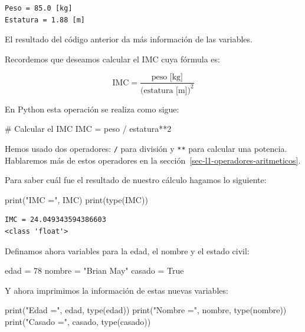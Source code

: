 \documentclass[
  spanish,
  letterpaper,
]{scrbook}
\newenvironment{Shaded}{\begin{snugshade}}{\end{snugshade}}
\newcommand{\BuiltInTok}[1]{\textcolor[rgb]{0.00,0.23,0.31}{#1}}
\newcommand{\CommentTok}[1]{\textcolor[rgb]{0.37,0.37,0.37}{#1}}
\newcommand{\DecValTok}[1]{\textcolor[rgb]{0.68,0.00,0.00}{#1}}
\newcommand{\NormalTok}[1]{\textcolor[rgb]{0.00,0.23,0.31}{#1}}
\newcommand{\OperatorTok}[1]{\textcolor[rgb]{0.37,0.37,0.37}{#1}}
\newcommand{\StringTok}[1]{\textcolor[rgb]{0.13,0.47,0.30}{#1}}
\newcommand{\VariableTok}[1]{\textcolor[rgb]{0.07,0.07,0.07}{#1}}
\theoremstyle{definition}
\theoremstyle{remark}
\begin{document}
\begin{verbatim}
Peso = 85.0 [kg]
Estatura = 1.88 [m]
\end{verbatim}

El resultado del código anterior da más información de las variables.

Recordemos que deseamos calcular el IMC cuya fórmula es:

\[
\text{IMC} = \dfrac{\text{peso [kg]}}{(\text{estatura [m])}^2}
\]

En Python esta operación se realiza como sigue:

\begin{Shaded}
\begin{Highlighting}[]
\CommentTok{\# Calcular el IMC}
\NormalTok{IMC }\OperatorTok{=}\NormalTok{ peso }\OperatorTok{/}\NormalTok{ estatura}\OperatorTok{**}\DecValTok{2}
\end{Highlighting}
\end{Shaded}

Hemos usado dos operadores: \texttt{/} para división y \texttt{**} para
calcular una potencia. Hablaremos más de estos operadores en la
sección~\ref{sec-l1-operadores-aritmeticos}.

Para saber cuál fue el resultado de nuestro cálculo hagamos lo
siguiente:

\begin{Shaded}
\begin{Highlighting}[]
\BuiltInTok{print}\NormalTok{(}\StringTok{"IMC ="}\NormalTok{, IMC)}
\BuiltInTok{print}\NormalTok{(}\BuiltInTok{type}\NormalTok{(IMC))}
\end{Highlighting}
\end{Shaded}

\begin{verbatim}
IMC = 24.049343594386603
<class 'float'>
\end{verbatim}

Definamos ahora variables para la edad, el nombre y el estado civil:

\begin{Shaded}
\begin{Highlighting}[]
\NormalTok{edad }\OperatorTok{=} \DecValTok{78}
\NormalTok{nombre }\OperatorTok{=} \StringTok{"Brian May"}
\NormalTok{casado }\OperatorTok{=} \VariableTok{True}
\end{Highlighting}
\end{Shaded}

Y ahora imprimimos la información de estas nuevas variables:

\begin{Shaded}
\begin{Highlighting}[]
\BuiltInTok{print}\NormalTok{(}\StringTok{"Edad ="}\NormalTok{, edad, }\BuiltInTok{type}\NormalTok{(edad))}
\BuiltInTok{print}\NormalTok{(}\StringTok{"Nombre ="}\NormalTok{, nombre, }\BuiltInTok{type}\NormalTok{(nombre))}
\BuiltInTok{print}\NormalTok{(}\StringTok{"Casado ="}\NormalTok{, casado, }\BuiltInTok{type}\NormalTok{(casado))}
\end{Highlighting}
\end{Shaded}
\end{document}
